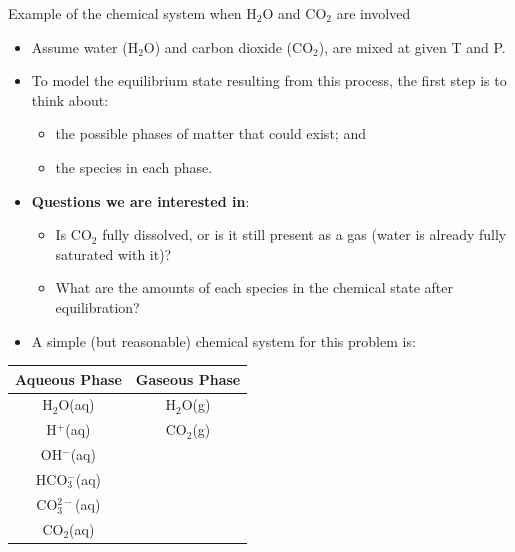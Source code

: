 %
\begin{frame}{Example of the chemical system when H$_{2}$O and CO$_{2}$ are involved}

\lcol
\begin{itemize}
\item Assume water (H$_{2}$O) and carbon dioxide (CO$_{2}$), are mixed
at given T and P. 
\pause
\item To model the equilibrium state resulting from this process, the first
step is to think about:
\begin{itemize}
\item the possible phases of matter that could exist; and
\item the species in each phase. 
\end{itemize}
%
\pause
\item \alert{\textbf{Questions we are interested in}}: 
\begin{itemize}
\item Is CO$_{2}$ fully dissolved, or is it still present as a gas (water is already fully saturated with it)?
\item What are the amounts of each species in the chemical state after equilibration?
\end{itemize}
\end{itemize}
\pause
\rcol
\begin{itemize}
\item A simple (but reasonable) chemical system for this problem is:
\end{itemize}
\begin{center}
\begin{tabular}{cc}
\toprule 
\textbf{Aqueous Phase} & \textbf{Gaseous Phase}\tabularnewline
\midrule
H$_{2}$O(aq) & H$_{2}$O(g)\tabularnewline
H$^{+}$(aq) & CO$_{2}$(g)\tabularnewline
OH$^{-}$(aq) & \tabularnewline
HCO$_{3}^{-}$(aq) & \tabularnewline
CO$_{3}^{2-}$(aq) & \tabularnewline
CO$_{2}$(aq) & \tabularnewline
\bottomrule
\end{tabular}
\par\end{center}

\ecol
\end{frame}
%
